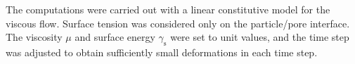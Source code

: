 \documentclass[12pt,a4paper,fleqn]{article}
\newcommand{\surf}{\mathrm{s}}
\begin{document}
The computations were carried out with a linear constitutive model for the viscous flow.
Surface tension was considered only on the particle/pore interface.
The viscosity $\mu$ and surface energy $\gamma_\surf$ were set to unit values, and the time step was adjusted to obtain sufficiently small deformations in each time step.
%
\begin{figure}[thpb!]
    \centering
    \hspace{1em}

\end{figure}
\end{document}
